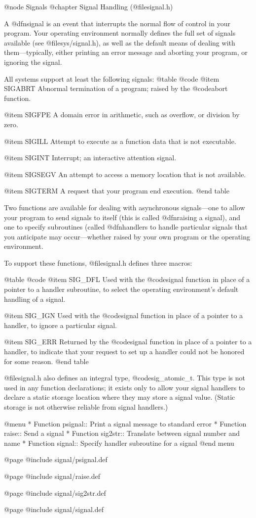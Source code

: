 @node Signals
@chapter Signal Handling (@file{signal.h})

A @dfn{signal} is an event that interrupts the normal flow of control
in your program.  Your operating environment normally defines the full
set of signals available (see @file{sys/signal.h}), as well as the
default means of dealing with them---typically, either printing an
error message and aborting your program, or ignoring the signal.

All systems support at least the following signals:
@table @code
@item SIGABRT
Abnormal termination of a program; raised by the @code{abort} function.

@item SIGFPE
A domain error in arithmetic, such as overflow, or division by zero.

@item SIGILL
Attempt to execute as a function data that is not executable.

@item SIGINT
Interrupt; an interactive attention signal.

@item SIGSEGV
An attempt to access a memory location that is not available.

@item SIGTERM
A request that your program end execution.
@end table

Two functions are available for dealing with asynchronous
signals---one to allow your program to send signals to itself (this is
called @dfn{raising} a signal), and one to specify subroutines (called
@dfn{handlers} to handle particular signals that you anticipate may
occur---whether raised by your own program or the operating environment.

To support these functions, @file{signal.h} defines three macros:

@table @code
@item SIG_DFL
Used with the @code{signal} function in place of a pointer to a
handler subroutine, to select the operating environment's default
handling of a signal.

@item SIG_IGN
Used with the @code{signal} function in place of a pointer to a
handler, to ignore a particular signal.

@item SIG_ERR
Returned by the @code{signal} function in place of a pointer to a
handler, to indicate that your request to set up a handler could not
be honored for some reason.
@end table

@file{signal.h} also defines an integral type, @code{sig_atomic_t}.
This type is not used in any function declarations; it exists only to
allow your signal handlers to declare a static storage location where
they may store a signal value.  (Static storage is not otherwise
reliable from signal handlers.)

@menu
* Function psignal:: Print a signal message to standard error
* Function raise::   Send a signal
* Function sig2str:: Translate between signal number and name
* Function signal::  Specify handler subroutine for a signal
@end menu

@page
@include signal/psignal.def

@page
@include signal/raise.def

@page
@include signal/sig2str.def

@page
@include signal/signal.def
